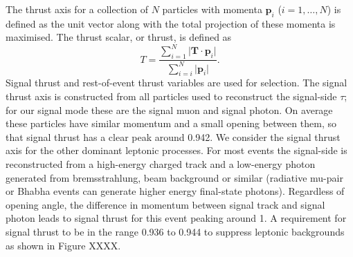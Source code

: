 \documentclass[12pt]{thesis}  %
\begin{document}
The thrust axis for a collection of $N$ particles with momenta $\mathbf{p}_{i}$ ($i = 1,\ldots, N$) is defined as the unit vector along with the total projection of these momenta is maximised. The thrust scalar, or thrust, is defined as
\begin{equation}
T = \frac{\sum^N_{i=1}\lvert\mathbf{T}\cdot\mathbf{p}_i\rvert}{\sum^N_{i=i}\lvert\mathbf{p}_i\rvert}.
\end{equation}
Signal thrust and rest-of-event thrust variables are used for selection. The signal thrust axis is constructed from all particles used to reconstruct the signal-side $\tau$; for our signal mode these are the signal muon and signal photon. On average these particles have similar momentum and a small opening between them, so that signal thrust has a clear peak around \num{0.942}. We consider the signal thrust axis for the other dominant leptonic processes. For most events the signal-side is reconstructed from a high-energy charged track and a low-energy photon generated from bremsstrahlung, beam background or similar (radiative mu-pair or Bhabha events can generate higher energy final-state photons). Regardless of opening angle, the difference in momentum between signal track and signal photon leads to signal thrust for this event peaking around \num{1}. A requirement for signal thrust to be in the range \num{0.936} to \num{0.944} to suppress leptonic backgrounds as shown in Figure XXXX. 
\end{document}
